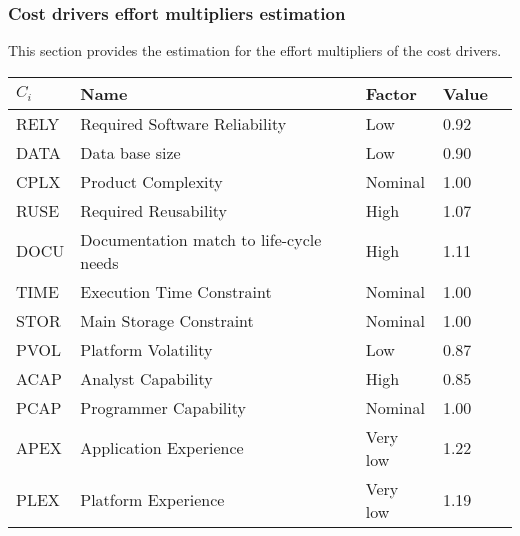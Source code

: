 \subsubsection{Cost drivers effort multipliers estimation}
\label{sub:cost_drivers}
This section provides the estimation for the effort multipliers of the cost drivers.

\begin{table}[!htbp]
    \centering
    \begin{tabular}{| l | l | l | l | l |}
        \hline
        \textbf{$C_i$}   & \textbf{Name}                             & \textbf{Factor}   & \textbf{Value}    \\
        \hline
        RELY            & Required Software Reliability             & Low              & 0.92             \\
        \hline
        DATA            & Data base size                            & Low              & 0.90               \\
        \hline
        CPLX            & Product Complexity                        & Nominal              & 1.00              \\
        \hline
        RUSE            & Required Reusability                      & High                 & 1.07              \\
        \hline
        DOCU            & Documentation match to life-cycle needs   & High              & 1.11              \\
        \hline
        TIME            & Execution Time Constraint                 & Nominal              & 1.00              \\
        \hline
        STOR            & Main Storage Constraint                   & Nominal              & 1.00              \\
        \hline
        PVOL            & Platform Volatility                       & Low                  & 0.87              \\
        \hline
        ACAP            & Analyst Capability                        & High                 & 0.85              \\
        \hline
        PCAP            & Programmer Capability                     & Nominal              & 1.00              \\
        \hline
        APEX            & Application Experience                    & Very low             & 1.22              \\
        \hline
        PLEX            & Platform Experience                       & Very low             & 1.19              \\

\end{tabular}
\end{table}
